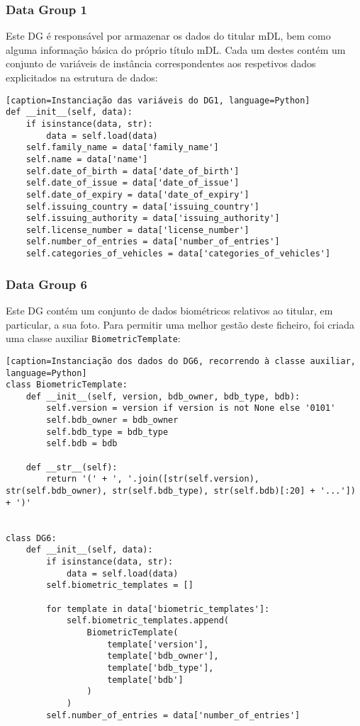 \subsubsection{Data Group 1}

Este DG é responsável por armazenar os dados do titular mDL, bem como alguma informação básica do próprio título mDL. Cada um destes contém um conjunto de variáveis de instância correspondentes aos respetivos dados explicitados na estrutura de dados:

\begin{verbatim}[caption=Instanciação das variáveis do DG1, language=Python]
def __init__(self, data):
    if isinstance(data, str):
        data = self.load(data)
    self.family_name = data['family_name']
    self.name = data['name']
    self.date_of_birth = data['date_of_birth']
    self.date_of_issue = data['date_of_issue']
    self.date_of_expiry = data['date_of_expiry']
    self.issuing_country = data['issuing_country']
    self.issuing_authority = data['issuing_authority']
    self.license_number = data['license_number']
    self.number_of_entries = data['number_of_entries']
    self.categories_of_vehicles = data['categories_of_vehicles']
\end{verbatim}

\subsubsection{Data Group 6}

Este DG contém um conjunto de dados biométricos relativos ao titular, em particular, a sua foto. Para permitir uma melhor gestão deste ficheiro, foi criada uma classe auxiliar \texttt{BiometricTemplate}:

\begin{verbatim}[caption=Instanciação dos dados do DG6, recorrendo à classe auxiliar, language=Python]
class BiometricTemplate:
    def __init__(self, version, bdb_owner, bdb_type, bdb):
        self.version = version if version is not None else '0101'
        self.bdb_owner = bdb_owner
        self.bdb_type = bdb_type
        self.bdb = bdb
    
    def __str__(self):
        return '(' + ', '.join([str(self.version), str(self.bdb_owner), str(self.bdb_type), str(self.bdb)[:20] + '...']) + ')'


class DG6:
    def __init__(self, data):
        if isinstance(data, str):
            data = self.load(data)
        self.biometric_templates = []
        
        for template in data['biometric_templates']:
            self.biometric_templates.append(
                BiometricTemplate(
                    template['version'],
                    template['bdb_owner'],
                    template['bdb_type'],
                    template['bdb']
                )
            )
        self.number_of_entries = data['number_of_entries']
\end{verbatim}

